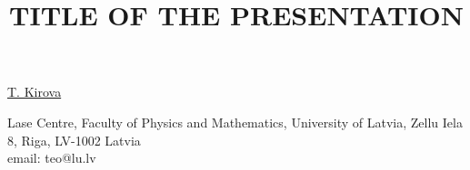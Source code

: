 \title{TITLE OF THE PRESENTATION}

\underline{T. Kirova}


Lase Centre, Faculty of Physics and Mathematics,
University of Latvia,
Zellu Iela 8,
Riga, LV-1002
Latvia\\
email: teo@lu.lv

\vspace{\baselineskip}